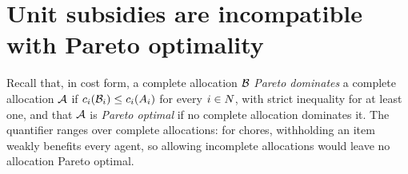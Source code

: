 
\section{Unit subsidies are incompatible with Pareto optimality}
\label{app:pareto-sec}

Recall that, in cost form, a complete allocation $\mathcal{B}$ \emph{Pareto
dominates} a complete allocation $\mathcal{A}$ if
$c_i(\mathcal{B}_i) \le c_i(A_{i})$ for every $i \in N$, with
strict inequality for at least one, and that $\mathcal{A}$ is \emph{Pareto optimal}
if no complete allocation dominates it. The quantifier ranges over complete
allocations: for chores, withholding an item weakly benefits every agent, so
allowing incomplete allocations would leave no allocation Pareto optimal.

